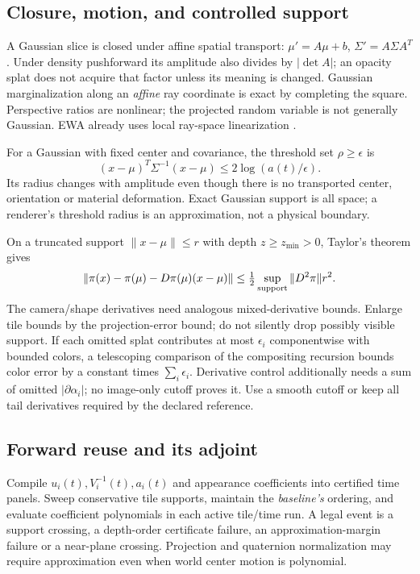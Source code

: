 \documentclass[10pt,letterpaper]{article}
\theoremstyle{remark}\newtheorem{counterexample}[proposition]{Counterexample}
\begin{document}
\subsection{Closure, motion, and controlled support}
A Gaussian slice is closed under affine spatial transport: $\mu'=A\mu+b$, $\Sigma'=A\Sigma A^T$. Under density pushforward its amplitude also divides by $|\det A|$; an opacity splat does not acquire that factor unless its meaning is changed. Gaussian marginalization along an \emph{affine} ray coordinate is exact by completing the square. Perspective ratios are nonlinear; the projected random variable is not generally Gaussian. EWA already uses local ray-space linearization \cite{ewa}.

For a Gaussian with fixed center and covariance, the threshold set $\rho\geq\epsilon$ is
\begin{equation}
 (x-\mu)^T\Sigma^{-1}(x-\mu)\leq2\log(a(t)/\epsilon).
\end{equation}
Its radius changes with amplitude even though there is no transported center, orientation or material deformation. Exact Gaussian support is all space; a renderer's threshold radius is an approximation, not a physical boundary.

On a truncated support $\|x-\mu\|\leq r$ with depth $z\geq z_{\min}>0$, Taylor's theorem gives
\begin{equation}
 \|\pi(x)-\pi(\mu)-D\pi(\mu)(x-\mu)\|
 \leq\tfrac12\sup_{\rm support}\|D^2\pi\|r^2. \label{eq:perspectiveerror}
\end{equation}
The camera/shape derivatives need analogous mixed-derivative bounds. Enlarge tile bounds by the projection-error bound; do not silently drop possibly visible support. If each omitted splat contributes at most $\epsilon_i$ componentwise with bounded colors, a telescoping comparison of the compositing recursion bounds color error by a constant times $\sum_i\epsilon_i$. Derivative control additionally needs a sum of omitted $|\partial\alpha_i|$; no image-only cutoff proves it. Use a smooth cutoff or keep all tail derivatives required by the declared reference.

\subsection{Forward reuse and its adjoint}
Compile $u_i(t),V_i^{-1}(t),a_i(t)$ and appearance coefficients into certified time panels. Sweep conservative tile supports, maintain the \emph{baseline's} ordering, and evaluate coefficient polynomials in each active tile/time run. A legal event is a support crossing, a depth-order certificate failure, an approximation-margin failure or a near-plane crossing. Projection and quaternion normalization may require approximation even when world center motion is polynomial.
\end{document}

